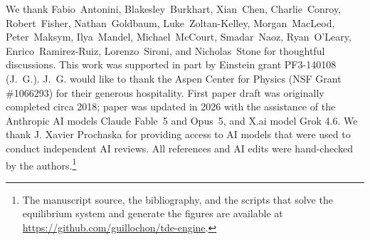 \documentclass[preprint2]{aastex}
\begin{document}
\bigskip
\acknowledgements
\begin{sloppypar}
We thank Fabio~Antonini, Blakesley~Burkhart, Xian~Chen, Charlie~Conroy, Robert~Fisher, Nathan~Goldbaum, Luke~Zoltan-Kelley, Morgan~MacLeod, Peter~Maksym, Ilya~Mandel, Michael~McCourt, Smadar~Naoz, Ryan~O'Leary, Enrico~Ramirez-Ruiz, Lorenzo~Sironi, and Nicholas~Stone for thoughtful discussions. This work was supported in part by Einstein grant PF3-140108 (J.~G.). J.~G. would like to thank the Aspen Center for Physics (NSF Grant \#1066293) for their generous hospitality. First paper draft was originally completed circa 2018; paper was updated in 2026 with the assistance of the Anthropic AI models Claude Fable~5 and Opus~5, and X.ai model Grok 4.6. We thank J. Xavier Prochaska for providing access to AI models that were used to conduct independent AI reviews. All references and AI edits were hand-checked by the authors.\footnote{The manuscript source, the bibliography, and the scripts that solve the equilibrium system and generate the figures are available at \url{https://github.com/guillochon/tde-engine}.}
\end{sloppypar}



\end{document}
